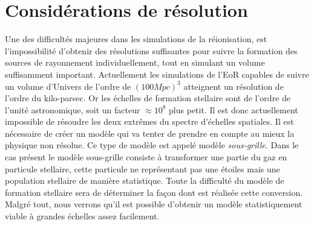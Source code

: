 \section{Considérations de résolution}

Une des difficultés majeures dans les simulations de la réionisation, est l'impossibilité d'obtenir des résolutions suffisantes pour suivre la formation des sources de rayonnement individuellement, tout en simulant un volume suffisamment important.
Actuellement les simulations de l'\ac{EoR} capables de suivre un volume d'Univers de l'ordre de $(100Mpc)^3$ atteignent un résolution de l'ordre du kilo-parsec.
Or les échelles de formation stellaire sont de l'ordre de l'unité astronomique, soit un facteur $\approx 10^8$ plus petit.
Il est donc actuellement impossible de résoudre les deux extrêmes du spectre d'échelles spatiales.
Il est nécessaire de créer un modèle qui va tenter de prendre en compte au mieux la physique non résolue.
Ce type de modèle est appelé modèle \textit{sous-grille}.
Dans le cas présent le modèle sous-grille consiste à transformer une partie du gaz en particule stellaire, cette particule ne représentant pas une étoiles mais une population stellaire de manière statistique.
Toute la difficulté du modèle de formation stellaire sera de déterminer la façon dont est réalisée cette conversion.
Malgré tout, nous verrons qu'il est possible d'obtenir un modèle statistiquement viable à grandes échelles assez facilement.



